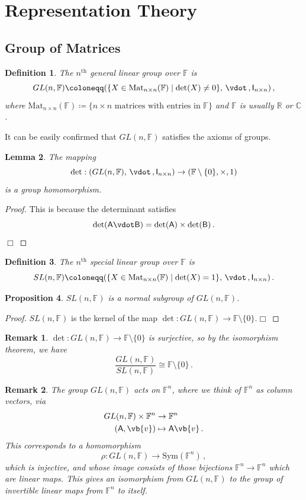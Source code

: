 \documentclass{article}
\theoremstyle{plain}\theoremheaderfont{\normalfont\itshape}\theorembodyfont{\rmfamily}\theoremseparator{.}\newtheorem*{rem}{Remark}\newtheorem*{ex}{Example}\newtheorem*{proof}{Proof}\newtheorem*{altp}{Alternative proof}
\theoremstyle{plain}\theoremheaderfont{\normalfont\bfseries}\theorembodyfont{\rmfamily}\theoremseparator{.}\newtheorem{thm}{Theorem}[section]\newtheorem{lem}[thm]{Lemma}\newtheorem{prop}[thm]{Proposition}\newtheorem*{cor}{Corollary}\newtheorem{defn}[thm]{Definition}\newtheorem{clm}[thm]{Claim}\newtheorem{clminproof}{Claim}
\theoremstyle{break}\theoremheaderfont{\normalfont\itshape}\theorembodyfont{\rmfamily}\theoremseparator{.\medskip}\newtheorem*{proofskip}{Proof}\newtheorem*{exs}{Examples}\newtheorem*{rems}{Remarks}
\theoremstyle{break}\theoremheaderfont{\normalfont\bfseries}\theorembodyfont{\rmfamily}\theoremseparator{.\medskip}\newtheorem{lemskip}[thm]{Lemma}\newtheorem{defnskip}[thm]{Definition}\newtheorem{propskip}[thm]{Proposition}\newtheorem{thmskip}[thm]{Theorem}
\numberwithin{equation}{section}
\newcommand{\qed}{\hfill\ensuremath{\Box}}
\begin{document}
	\newpage

	\section{Representation Theory}
	\subsection{Group of Matrices}
	\begin{defn}
		The \textit{\(n^\text{th}\) general linear group} over \(\mathbb{F}\) is
		\[GL(n,\mathbb{F})\coloneqq(\{X\in\mathrm{Mat}_{n\times n}(\mathbb{F})\mid \det(X)\ne 0\},\,\vdot\,,\mathsf{I}_{n\times n})\,,\]
		where \(\mathrm{Mat}_{n\times n}(\mathbb{F})\coloneqq\{n\times n \text{ matrices with entries in }\mathbb{F}\}\) and \(\mathbb{F}\) is usually \(\mathbb{R}\) or \(\mathbb{C}\).
	\end{defn}
	It can be easily confirmed that \(GL(n,\mathbb{F})\) satisfies the axioms of groups.
	\begin{lem}
		The mapping
		\[\det : (GL(n,\mathbb{F}), \,\vdot\,, \mathsf{I}_{n\times n}) \to (\mathbb{F} \setminus \{0\}, \times , 1)\]
		is a group homomorphism.
	\end{lem}
	\begin{proof}
		This is because the determinant satisfies
		\[\det(\mathsf{A}\vdot\mathsf{B})=\det(\mathsf{A})\times\det(\mathsf{B})\,.\]\qed
	\end{proof}
	\begin{defn}
		The \textit{\(n^\text{th}\) special linear group} over \(\mathbb{F}\) is
		\[SL(n,\mathbb{F})\coloneqq(\{X\in\mathrm{Mat}_{n\times n}(\mathbb{F})\mid \det(X)=1\},\,\vdot\,,\mathsf{I}_{n\times n})\,.\]
	\end{defn}
	\begin{prop}
		\(SL(n,\mathbb{F})\) is a normal subgroup of \(GL(n,\mathbb{F})\).
	\end{prop}
	\begin{proof}
		\(SL(n,\mathbb{F})\) is the kernel of the map \(\det : GL(n,\mathbb{F})\to \mathbb{F}\setminus\{0\}\).\qed
	\end{proof}
	\begin{rem}
		\(\det : GL(n,\mathbb{F})\to \mathbb{F}\setminus\{0\}\) is surjective, so by the isomorphism theorem, we have
		\[\frac{GL(n,\mathbb{F})}{SL(n,\mathbb{F})}\cong\mathbb{F}\setminus\{0\}\,.\]
	\end{rem}
	\begin{rem}
		The group \(GL(n,\mathbb{F})\) acts on \(\mathbb{F}^n\), where we think of \(\mathbb{F}^n\) as column vectors, via
		\begin{align*}
			GL(n,\mathbb{F}) \times \mathbb{F}^n &\to \mathbb{F}^n\\
			(\mathsf{A}, \vb{v}) &\mapsto\mathsf{A}\vb{v}\,.
		\end{align*}
		This corresponds to a homomorphism
		\[\rho : GL(n,\mathbb{F}) \to \mathrm{Sym}(\mathbb{F}^n)\,,\]
		which is injective, and whose image consists of those bijections \(\mathbb{F}^n\to\mathbb{F}^n\) which are linear maps. This gives an isomorphism from \(GL(n,\mathbb{F})\) to the group of invertible linear maps
		from \(\mathbb{F}^n\)	to itself.
	\end{rem}
\end{document}
